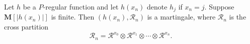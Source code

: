Let $h$ be a $P$-regular function and let $h(x_n)$ denote $h_j$ if $x_n = j$. Suppose $\mathbf{M}[|h(x_n)|]$ is finite. Then $(h(x_n), \mathcal{R}_n)$ is a martingale, where $\mathcal{R}_n$ is the cross partition
$$\mathcal{R}_n = \mathcal{R}^{x_0} \otimes \mathcal{R}^{x_1} \otimes \cdots \otimes \mathcal{R}^{x_n}.$$
